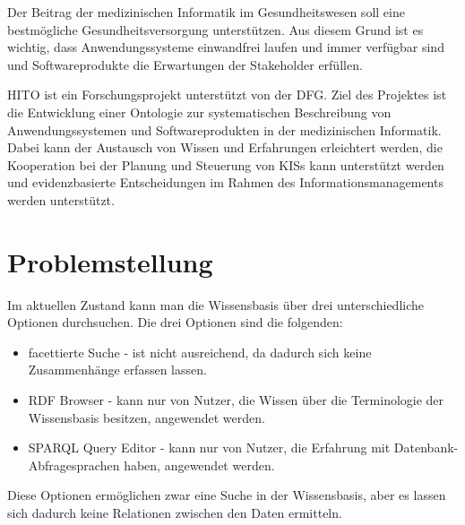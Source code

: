 
Der Beitrag der medizinischen Informatik im Gesundheitswesen soll eine bestmögliche Gesundheitsversorgung unterstützen.
Aus diesem Grund ist es wichtig, dass Anwendungssysteme einwandfrei laufen und immer verfügbar sind und Softwareprodukte die Erwartungen der Stakeholder erfüllen.

\ac{HITO} ist ein Forschungsprojekt unterstützt von der \ac{DFG}.
Ziel des Projektes ist die Entwicklung einer Ontologie zur systematischen Beschreibung von Anwendungssystemen und Softwareprodukten in der medizinischen Informatik.
Dabei kann der Austausch von Wissen und Erfahrungen erleichtert werden, die Kooperation bei der Planung und Steuerung von \acp{KIS} kann unterstützt werden und evidenzbasierte Entscheidungen im Rahmen des Informationsmanagements werden unterstützt.



\section{Problemstellung}\label{sec:problemstellung}


Im aktuellen Zustand kann man die Wissensbasis über drei unterschiedliche Optionen durchsuchen.
Die drei Optionen sind die folgenden:
\begin{itemize}
\item facettierte Suche - ist nicht ausreichend, da dadurch sich keine Zusammenhänge erfassen lassen.
\item RDF Browser - kann nur von Nutzer, die Wissen über die Terminologie der Wissensbasis besitzen, angewendet werden.
\item SPARQL Query Editor - kann nur von Nutzer, die Erfahrung mit Datenbank-Abfragesprachen haben, angewendet werden.
\end{itemize} 
Diese Optionen ermöglichen zwar eine Suche in der Wissensbasis, aber es lassen sich dadurch keine Relationen zwischen den Daten ermitteln.

